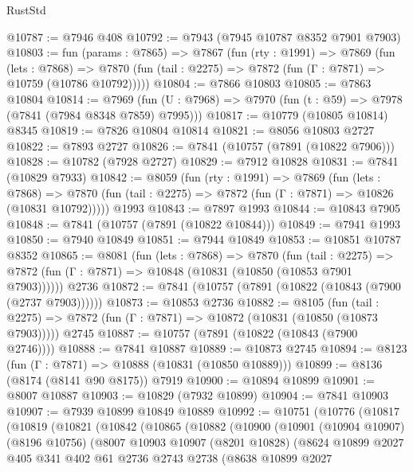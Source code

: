 \begin{lexlean}{RustStd}
\begin{coremodule}
@10787 := @7946 @408
@10792 := @7943 (@7945 @10787 @8352 @7901 @7903)
@10803 := fun (params : @7865) =>
  @7867
    (fun (rty : @1991) =>
    @7869
      (fun (lets : @7868) =>
      @7870 (fun (tail : @2275) => @7872 (fun (Γ : @7871) => @10759 (@10786 @10792)))))
@10804 := @7866 @10803
@10805 := @7863 @10804
@10814 := @7969
    (fun (U : @7968) => @7970 (fun (t : @59) => @7978 (@7841 (@7984 @8348 @7859) @7995)))
@10817 := @10779 (@10805 @10814) @8345
@10819 := @7826 @10804 @10814
@10821 := @8056 @10803 @2727
@10822 := @7893 @2727
@10826 := @7841 (@10757 (@7891 (@10822 @7906)))
@10828 := @10782 (@7928 @2727)
@10829 := @7912 @10828
@10831 := @7841 (@10829 @7933)
@10842 := @8059
    (fun (rty : @1991) =>
    @7869
      (fun (lets : @7868) =>
      @7870 (fun (tail : @2275) => @7872 (fun (Γ : @7871) => @10826 (@10831 @10792)))))
    @1993
@10843 := @7897 @1993
@10844 := @10843 @7905
@10848 := @7841 (@10757 (@7891 (@10822 @10844)))
@10849 := @7941 @1993
@10850 := @7940 @10849
@10851 := @7944 @10849
@10853 := @10851 @10787 @8352
@10865 := @8081
    (fun (lets : @7868) =>
    @7870
      (fun (tail : @2275) =>
      @7872 (fun (Γ : @7871) => @10848 (@10831 (@10850 (@10853 @7901 @7903))))))
    @2736
@10872 := @7841 (@10757 (@7891 (@10822 (@10843 (@7900 (@2737 @7903))))))
@10873 := @10853 @2736
@10882 := @8105
    (fun (tail : @2275) => @7872 (fun (Γ : @7871) => @10872 (@10831 (@10850 (@10873 @7903)))))
    @2745
@10887 := @10757 (@7891 (@10822 (@10843 (@7900 @2746))))
@10888 := @7841 @10887
@10889 := @10873 @2745
@10894 := @8123 (fun (Γ : @7871) => @10888 (@10831 (@10850 @10889)))
@10899 := @8136 (@8174 (@8141 @90 @8175)) @7919
@10900 := @10894 @10899
@10901 := @8007 @10887
@10903 := @10829 (@7932 @10899)
@10904 := @7841 @10903
@10907 := @7939 @10899 @10849 @10889
@10992 := @10751
    (@10776
      (@10817
        (@10819
          (@10821
            (@10842
              (@10865
                (@10882
                  (@10900
                    (@10901
                      (@10904 @10907)
                      (@8196 @10756)
                      (@8007
                        @10903
                        @10907
                        (@8201 @10828)
                        (@8624
                          @10899
                          @2027
                          @405
                          @341
                          @402
                          @61
                          @2736
                          @2743
                          @2738
                          (@8638
                            @10899
                            @2027

\end{coremodule}
\end{lexlean}
